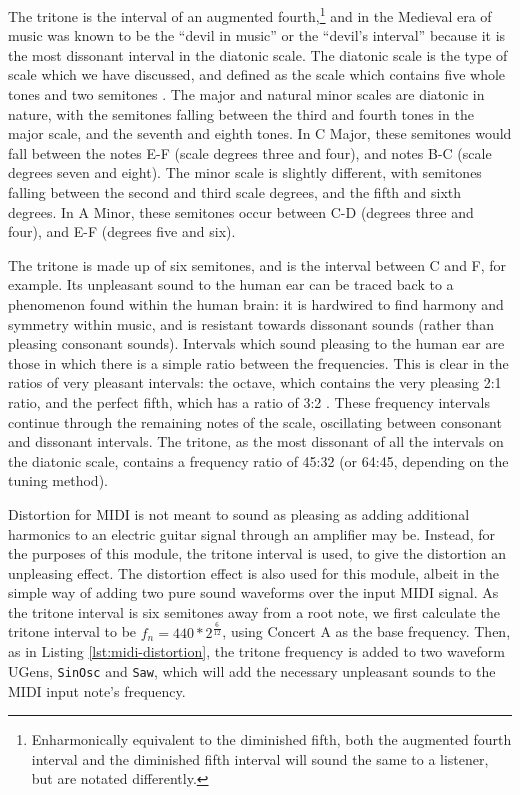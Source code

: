 The tritone is the interval of an augmented fourth,\footnote{Enharmonically equivalent to the diminished fifth, both the augmented fourth interval and the diminished fifth interval will sound the same to a listener, but are notated differently.} and in the Medieval era of music was known to be the ``devil in music'' or the ``devil's interval'' because it is the most dissonant interval in the diatonic scale. The diatonic scale is the type of scale which we have discussed, and defined as the scale which contains five whole tones and two semitones \cite{Burkholder_Grout_Palisca_2014}. The major and natural minor scales are diatonic in nature, with the semitones falling between the third and fourth tones in the major scale, and the seventh and eighth tones. In C Major, these semitones would fall between the notes E-F (scale degrees three and four), and notes B-C (scale degrees seven and eight). The minor scale is slightly different, with semitones falling between the second and third scale degrees, and the fifth and sixth degrees. In A Minor, these semitones occur between C-D (degrees three and four), and E-F (degrees five and six).

The tritone is made up of six semitones, and is the interval between C and F\musSharp{}, for example. Its unpleasant sound to the human ear can be traced back to a phenomenon found within the human brain: it is hardwired to find harmony and symmetry within music, and is resistant towards dissonant sounds (rather than pleasing consonant sounds). Intervals which sound pleasing to the human ear are those in which there is a simple ratio between the frequencies. This is clear in the ratios of very pleasant intervals: the octave, which contains the very pleasing 2:1 ratio, and the perfect fifth, which has a ratio of 3:2 \cite{Gann}. These frequency intervals continue through the remaining notes of the scale, oscillating between consonant and dissonant intervals. The tritone, as the most dissonant of all the intervals on the diatonic scale, contains a frequency ratio of 45:32 (or 64:45, depending on the tuning method). 

Distortion for MIDI is not meant to sound as pleasing as adding additional harmonics to an electric guitar signal through an amplifier may be. Instead, for the purposes of this module, the tritone interval is used, to give the distortion an unpleasing effect. The distortion effect is also used for this module, albeit in the simple way of adding two pure sound waveforms over the input MIDI signal. As the tritone interval is six semitones away from a root note, we first calculate the tritone interval to be $f_n = 440 * 2^\frac{6}{12}$, using Concert A as the base frequency. Then, as in Listing \ref{lst:midi-distortion}, the tritone frequency is added to two waveform UGens, \texttt{SinOsc} and \texttt{Saw}, which will add the necessary unpleasant sounds to the MIDI input note's frequency.

